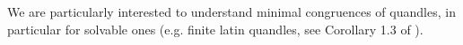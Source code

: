 \documentclass[a4paper, english, 9pt]{amsart}
\theoremstyle{plain}
\theoremstyle{definition}
\def\aut#1{\mathrm{Aut}(#1)}
\def\dis{\mathrm{Dis}}
\def\comment#1{{\color{red} #1}}
\def\LSS{\mathcal{LSS}}
\begin{document}

We are particularly interested to understand minimal congruences of quandles, in particular for solvable ones (e.g. finite latin quandles, see Corollary 1.3 of \cite{CP}).
\end{document}
